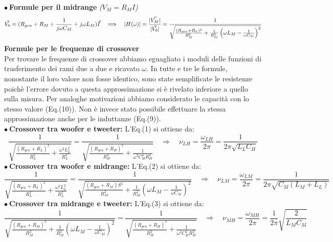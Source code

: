 \documentclass[]{article}
\begin{document}
$ \bullet \: $\textbf{Formule per il midrange} {\small\emph{($V_M=R_M I$)}}
\begin{equation}\label{V_{M}}
	\vec{V_0}=(R_{gen}+R_M+ \frac{1}{j\omega C_M}+j\omega L_M)\vec{I} \quad \Longrightarrow \quad \lvert H(\omega)\rvert=\frac{	\lvert \vec{V_M} \rvert}{\lvert \vec{V_0} \rvert}=\frac{1}{\sqrt{\frac{(R_{gen}+R_{L})^{2}}{R_{M}^{2}}+\frac{1}{R_{M}^{2}}\left( \omega L_{M}-\frac{1}{\omega C_{M}}\right) ^{2}}}
\end{equation}
\textbf{Formule per le frequenze di crossover}\\
Per trovare le frequenze di crossover abbiamo eguagliato i moduli delle funzioni di trasferimento dei rami due a due e ricavato $\omega$. In tutte e tre le formule, nonostante il loro valore non fosse identico, sono state semplificate le resistenze poichè l'errore dovuto a questa approssimazione si è rivelato inferiore a quello sulla misura. Per analoghe motivazioni abbiamo considerato le capacità con lo stesso valore (Eq.(10)). Non è invece stato possibile effettuare la stessa approssimazione anche per le induttanze (Eq.(9)).\\
$ \bullet  \:$\textbf{Crossover tra woofer e tweeter:}
L'Eq.(1) si ottiene da:
\begin{equation}\label{crossoverLH_H}
	\frac{1}{\sqrt{\frac{(R_{gen}+R_{L})^{2}}{R_{L}^{2}}+\frac{\omega^{2}L_{L}^{2}}{R_{L}^{2}}}}=\frac{1}{\sqrt{\frac{(R_{gen}+R_{H})^{2}}{R_{H}^{2}}+\frac{1}{\omega^{2}C_{H}^{2}R_{H}^{2}}}} \quad \Longrightarrow \quad \nu_{LH}=\frac{\omega_{LH}}{2\pi}=\frac{1}{2\pi\sqrt{L_{L}C_{H}}}
\end{equation}
$ \bullet \: $\textbf{Crossover tra woofer e midrange:}
L'Eq.(2) si ottiene da:
\begin{equation}\label{crossoverLM_H}
\frac{1}{\sqrt{\frac{(R_{gen}+R_{L})^{2}}{R_{L}^{2}}+\frac{\omega^{2}L_{L}^{2}}{R_{L}^{2}}}}=\frac{1}{\sqrt{\frac{(R_{gen}+R_{M})S^{2}}{R_{M}^{2}}+\frac{1}{R_{M}^{2}}\left( \omega L_{M}-\frac{1}{\omega C_{M}}\right) ^{2}}} \quad  \Longrightarrow \quad \nu_{LM}=\frac{\omega_{LM}}{2\pi}=\frac{1}{2\pi\sqrt{C_{M}(L_{M}+L_{L})}}
\end{equation}
$ \bullet  \:$\textbf{Crossover tra midrange e tweeter:} 
L'Eq.(3) si ottiene da:
\begin{equation}\label{crossoverMH_H}
	\frac{1}{\sqrt{\frac{(R_{gen}+R_{M})^{2}}{R_{M}^{2}}+\frac{1}{R_{M}^{2}}\left( \omega L_{M}-\frac{1}{\omega C_{M}}\right) ^{2}}}=\frac{1}{\sqrt{\frac{(R_{gen}+R_{H})^{2}}{R_{H}^{2}}+\frac{1}{\omega^{2}C_{H}^{2}R_{H}^{2}}}} \quad \Longrightarrow \quad \nu_{MH}=\frac{\omega_{MH}}{2\pi}=\frac{1}{2\pi}\sqrt{\frac{2}{L_{M}C_{M}}}
\end{equation}
\end{document}
